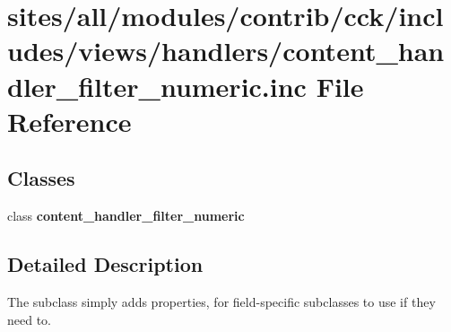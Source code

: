 \hypertarget{content__handler__filter__numeric_8inc}{
\section{sites/all/modules/contrib/cck/includes/views/handlers/content\_\-handler\_\-filter\_\-numeric.inc File Reference}
\label{content__handler__filter__numeric_8inc}
}
\subsection*{Classes}
\begin{CompactItemize}
\item 
class \textbf{content\_\-handler\_\-filter\_\-numeric}
\end{CompactItemize}


\subsection{Detailed Description}
The subclass simply adds properties, for field-specific subclasses to use if they need to. 